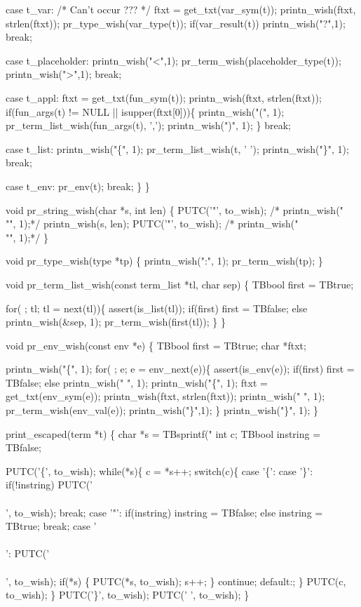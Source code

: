     case t_var: /* Can't occur ??? */
      ftxt = get_txt(var_sym(t));
      printn_wish(ftxt, strlen(ftxt));
      pr_type_wish(var_type(t));
      if(var_result(t))
        printn_wish("?",1);
      break;

    case t_placeholder:
      printn_wish("<",1);
      pr_term_wish(placeholder_type(t));
      printn_wish(">",1);
      break;

    case t_appl:
      ftxt = get_txt(fun_sym(t));
      printn_wish(ftxt, strlen(ftxt));
      if(fun_args(t) != NULL || isupper(ftxt[0]))\{
        printn_wish("(", 1);
        pr_term_list_wish(fun_args(t), ',');
        printn_wish(")", 1);
      \}
      break;

    case t_list:
      printn_wish("\{", 1); 
      pr_term_list_wish(t, ' ');
      printn_wish("\}", 1);
      break;

    case t_env:
      pr_env(t);
      break;
    \}
\}

void pr_string_wish(char *s, int len)
\{
  PUTC('"', to_wish);
/*  printn_wish("\\"", 1);*/
  printn_wish(s, len);
  PUTC('"', to_wish);
/*  printn_wish("\\"", 1);*/
\}

void pr_type_wish(type *tp)
\{
  printn_wish(":", 1); 
  pr_term_wish(tp);
\}

void pr_term_list_wish(const term_list *tl, char sep)
\{
  TBbool first = TBtrue;

  for( ; tl; tl = next(tl))\{
    assert(is_list(tl));    
    if(first)
      first = TBfalse;
    else
      printn_wish(&sep, 1);
    pr_term_wish(first(tl));
  \}
\}

void pr_env_wish(const env *e)
\{
  TBbool first = TBtrue;
  char *ftxt;

  printn_wish("\{", 1);
  for( ; e; e = env_next(e))\{
    assert(is_env(e));    
    if(first)
      first = TBfalse;
    else
      printn_wish(" ", 1);
    printn_wish("\{", 1);
    ftxt = get_txt(env_sym(e));
    printn_wish(ftxt, strlen(ftxt));
    printn_wish(" ", 1);
    pr_term_wish(env_val(e));
    printn_wish("\}",1);
  \}
  printn_wish("\}", 1);
\}


print_escaped(term *t)
\{
  char *s = TBsprintf("%
  int c;
  TBbool instring = TBfalse;

  PUTC('\{', to_wish);
  while(*s)\{
    c = *s++;
    switch(c)\{
    case '\{': case '\}':
      if(!instring)
        PUTC('\\\\', to_wish);
      break;
    case '"':      
      if(instring)
        instring = TBfalse;
      else
        instring = TBtrue;
      break;
    case '\\\\':
      PUTC('\\\\', to_wish);
      if(*s) \{
        PUTC(*s, to_wish);
        s++;
      \}
      continue;
    default:;
    \}
    PUTC(c, to_wish);
  \}
  PUTC('\}', to_wish);
  PUTC(' ', to_wish);
\}


